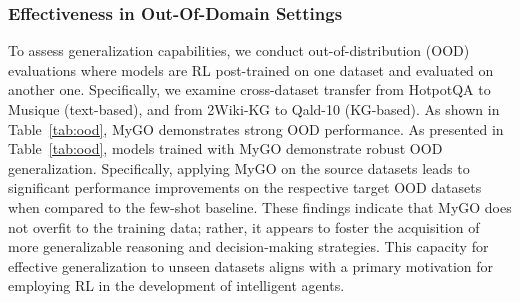 \subsubsection{\textbf{Effectiveness in Out-Of-Domain Settings}} 
To assess generalization capabilities, we conduct out-of-distribution (OOD) evaluations where models are RL post-trained on one dataset and evaluated on another one.
Specifically, we examine cross-dataset transfer from HotpotQA to Musique (text-based), and from 2Wiki-KG to Qald-10 (KG-based).
As shown in Table~\ref{tab:ood}, MyGO demonstrates strong OOD performance.
As presented in Table~\ref{tab:ood}, models trained with MyGO demonstrate robust OOD generalization.
Specifically, applying MyGO on the source datasets leads to significant performance improvements on the respective target OOD datasets when compared to the few-shot baseline.
These findings indicate that MyGO does not overfit to the training data; rather, it appears to foster the acquisition of more generalizable reasoning and decision-making strategies.
This capacity for effective generalization to unseen datasets aligns with a primary motivation for employing RL in the development of intelligent agents.
\begin{table}[h]
\label{table_2}
    \centering %
    \renewcommand{\arraystretch}{1.1} %
    \caption{Out-of-distribution Evaluation on Qwen 2.5-7B: HotpotQA$\to$Musique and 2Wiki-KG$\to$QALD-10.}
    \vspace{-0.5em}
    \label{tab:ood}
    \vspace{.5em}
\end{table}


